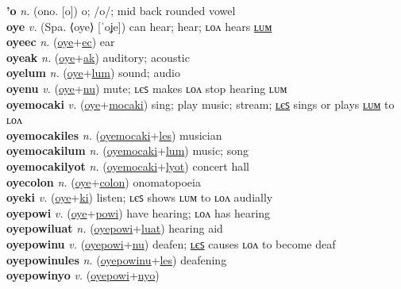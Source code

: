 \textbf{'o} \textit{n.} (ono. [o])
o; /o/; mid back rounded vowel \label{'o} \\
\textbf{oye} \textit{v.} (Spa. ⟨oye⟩ [ˈoʝe])
can hear; hear; ʟᴏᴧ hears \hyperref[oyelum]{ʟᴜᴍ} \label{oye} \\
\textbf{oyeec} \textit{n.} (\hyperref[oye]{oye}+\hyperref[ec]{ec})
ear \label{oyeec} \\
\textbf{oyeak} \textit{n.} (\hyperref[oye]{oye}+\hyperref[ak]{ak})
auditory; acoustic \label{oyeak} \\
\textbf{oyelum} \textit{n.} (\hyperref[oye]{oye}+\hyperref[lum]{lum})
sound; audio \label{oyelum} \\
\textbf{oyenu} \textit{v.} (\hyperref[oye]{oye}+\hyperref[nu]{nu})
mute; ʟєꜱ makes ʟᴏᴧ stop hearing ʟᴜᴍ \label{oyenu} \\
\textbf{oyemocaki} \textit{v.} (\hyperref[oye]{oye}+\hyperref[mocaki]{mocaki})
sing; play music; stream; \hyperref[oyemocakiles]{ʟєꜱ} sings or plays \hyperref[oyemocakilum]{ʟᴜᴍ} to ʟᴏᴧ \label{oyemocaki} \\
\textbf{oyemocakiles} \textit{n.} (\hyperref[oyemocaki]{oyemocaki}+\hyperref[les]{les})
musician \label{oyemocakiles} \\
\textbf{oyemocakilum} \textit{n.} (\hyperref[oyemocaki]{oyemocaki}+\hyperref[lum]{lum})
music; song \label{oyemocakilum} \\
\textbf{oyemocakilyot} \textit{n.} (\hyperref[oyemocaki]{oyemocaki}+\hyperref[lyot]{lyot})
concert hall \label{oyemocakilyot} \\
\textbf{oyecolon} \textit{n.} (\hyperref[oye]{oye}+\hyperref[colon]{colon})
onomatopoeia \label{oyecolon} \\
\textbf{oyeki} \textit{v.} (\hyperref[oye]{oye}+\hyperref[ki]{ki})
listen; ʟєꜱ shows ʟᴜᴍ to ʟᴏᴧ audially \label{oyeki} \\
\textbf{oyepowi} \textit{v.} (\hyperref[oye]{oye}+\hyperref[powi]{powi})
have hearing; ʟᴏᴧ has hearing \label{oyepowi} \\
\textbf{oyepowiluat} \textit{n.} (\hyperref[oyepowi]{oyepowi}+\hyperref[luat]{luat})
hearing aid \label{oyepowiluat} \\
\textbf{oyepowinu} \textit{v.} (\hyperref[oyepowi]{oyepowi}+\hyperref[nu]{nu})
deafen; \hyperref[oyepowinules]{ʟєꜱ} causes ʟᴏᴧ to become deaf \label{oyepowinu} \\
\textbf{oyepowinules} \textit{n.} (\hyperref[oyepowinu]{oyepowinu}+\hyperref[les]{les})
deafening \label{oyepowinules} \\
\textbf{oyepowinyo} \textit{v.} (\hyperref[oyepowi]{oyepowi}+\hyperref[nyo]{nyo})
